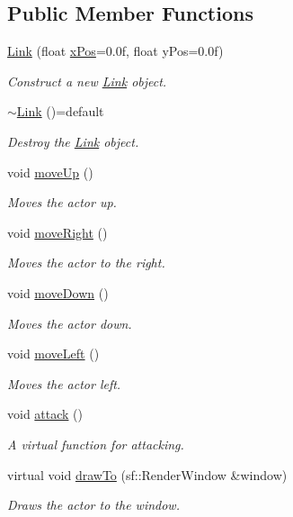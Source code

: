 \subsection*{Public Member Functions}
\begin{DoxyCompactItemize}
\item 
\mbox{\hyperlink{classLink_ab709f50a45a23296e9e78baf5bb75c67}{Link}} (float \mbox{\hyperlink{classActor_ab460c32c344963afcf476926367bd794}{x\+Pos}}=0.\+0f, float y\+Pos=0.\+0f)
\begin{DoxyCompactList}\small\item\em Construct a new \mbox{\hyperlink{classLink}{Link}} object. \end{DoxyCompactList}\item 
\mbox{\hyperlink{classLink_a7be82ff147159742ad26febff8a9439b}{$\sim$\+Link}} ()=default
\begin{DoxyCompactList}\small\item\em Destroy the \mbox{\hyperlink{classLink}{Link}} object. \end{DoxyCompactList}\item 
void \mbox{\hyperlink{classLink_a850a1e6c7a68d921b36d30dc918a7668}{move\+Up}} ()
\begin{DoxyCompactList}\small\item\em Moves the actor up. \end{DoxyCompactList}\item 
void \mbox{\hyperlink{classLink_aa1d60136a88be20a14179a5760ed91da}{move\+Right}} ()
\begin{DoxyCompactList}\small\item\em Moves the actor to the right. \end{DoxyCompactList}\item 
void \mbox{\hyperlink{classLink_a9ff8ec271a0119f6e1ee178afb47f323}{move\+Down}} ()
\begin{DoxyCompactList}\small\item\em Moves the actor down. \end{DoxyCompactList}\item 
void \mbox{\hyperlink{classLink_a682bab2dc3f967e35a67dcc74c1d4722}{move\+Left}} ()
\begin{DoxyCompactList}\small\item\em Moves the actor left. \end{DoxyCompactList}\item 
void \mbox{\hyperlink{classLink_a0d56dc31b6bf76258f50a393e92f46c4}{attack}} ()
\begin{DoxyCompactList}\small\item\em A virtual function for attacking. \end{DoxyCompactList}\item 
virtual void \mbox{\hyperlink{classLink_ac91a924fdf779fa02d477b7f60dbdc1e}{draw\+To}} (sf\+::\+Render\+Window \&window)
\begin{DoxyCompactList}\small\item\em Draws the actor to the window. \end{DoxyCompactList}\end{DoxyCompactItemize}
